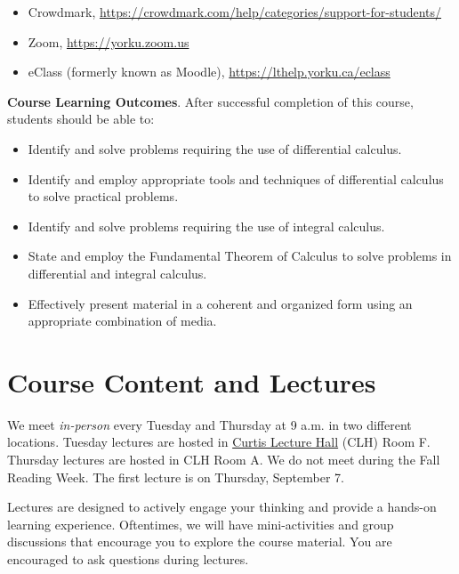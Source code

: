 \documentclass[./main.tex]{subfiles}
\begin{document}
\begin{itemize}
  \item Crowdmark, \url{https://crowdmark.com/help/categories/support-for-students/}
  \item Zoom, \url{https://yorku.zoom.us}
  \item eClass (formerly known as Moodle), \url{https://lthelp.yorku.ca/eclass}
\end{itemize}

\textbf{Course Learning Outcomes}. After successful completion of this course, students should be able to:
\begin{itemize}
\item Identify and solve problems requiring the use of differential calculus.
\item Identify and employ appropriate tools and techniques of differential calculus to solve practical problems.
\item Identify and solve problems requiring the use of integral calculus.
\item State and employ the Fundamental Theorem of Calculus to solve problems in differential and integral calculus.
\item Effectively present material in a coherent and organized form using an appropriate combination of media.
\end{itemize}

\section*{Course Content and Lectures}

We meet \emph{in-person} every Tuesday and Thursday at 9 a.m. in two different locations. Tuesday lectures are hosted in \href{https://goo.gl/maps/51Jn73q3hCKdeUt87}{Curtis Lecture Hall} (CLH) Room F. Thursday lectures are hosted in CLH Room A. We do not meet during the Fall Reading Week.
The first lecture is on Thursday, September 7.

Lectures are designed to actively engage your thinking and provide a hands-on learning experience. Oftentimes, we will have mini-activities and group discussions that encourage you to explore the course material. You are encouraged to ask questions during lectures. 
\end{document}
